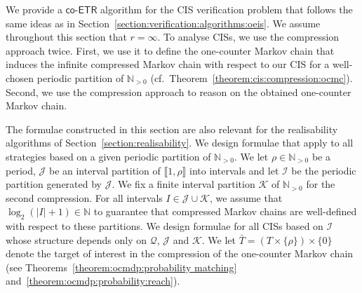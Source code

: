 \documentclass[a4paper,UKenglish,cleveref,autoref,thm-restate,colorlinks]{lipics-v2021}
\newcommand{\integerInterval}[1]{\llbracket{}#1\rrbracket{}}
\newcommand{\coetr}{\textsf{co-ETR}}
\newcommand{\IN}{\mathbb{N}}
\newcommand{\INpos}{\IN_{>0}}
\newcommand{\ocmdp}{\mathcal{Q}}
\newcommand{\counterUB}{r}
\newcommand{\period}{\rho}
\newcommand{\intPart}{\mathcal{I}}
\newcommand{\intPartB}{\mathcal{J}}
\newcommand{\intPartC}{\mathcal{K}}
\newcommand{\interval}{I}
\newcommand{\target}{T}
\begin{document}
We provide a $\coetr$ algorithm for the CIS verification problem that follows the same ideas as in Section~\ref{section:verification:algorithms:oeis}.
We assume throughout this section that $\counterUB=\infty$.
To analyse CISs, we use the compression approach twice.
First, we use it to define the one-counter Markov chain that induces the infinite compressed Markov chain with respect to our CIS for a well-chosen periodic partition of $\INpos$ (cf.~Theorem~\ref{theorem:cis:compression:ocmc}).
Second, we use the compression approach to reason on the obtained one-counter Markov chain.

The formulae constructed in this section are also relevant for the realisability algorithms of Section~\ref{section:realisability}.
We design formulae that apply to all strategies based on a given periodic partition of $\INpos$.
We let $\period\in\INpos$ be a period, $\intPartB$ be an interval partition of $\integerInterval{1, \period}$ into intervals and let $\intPart$ be the periodic partition generated by $\intPartB$.
We fix a finite interval partition $\intPartC$ of $\INpos$ for the second compression.
For all intervals $\interval\in\intPartB\cup\intPartC$, we assume that $\log_2(|\interval|+1)\in\IN$ to guarantee that compressed Markov chains are well-defined with respect to these partitions.
We design formulae for all CISs based on $\intPart$ whose structure depends only on $\ocmdp$, $\intPartB$ and $\intPartC$.
We let $\bar{\target} = (\target\times\{\period\})\times\{0\}$ denote the target of interest in the compression of the one-counter Markov chain (see Theorems~\ref{theorem:ocmdp:probability matching} and~\ref{theorem:ocmdp:probability:reach}).
\end{document}
